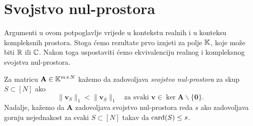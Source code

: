\documentclass[a4paper,twoside,12pt]{memoir} %
\newcommand{\vect}[1]{\mathbf{#1}}
\renewcommand{\vec}{\vect}
\newcommand{\card}{\text{\normalfont{card}}}
\newcommand{\norm}[1]{\|{#1}\|}
\begin{document}
\section[Svojstvo nul-prostora][Svojstvo nul-prostora]{Svojstvo nul-prostora}
Argumenti u ovom potpoglavlje vrijede u kontekstu realnih i u konteksu kompleksnih prostora. Stoga \'cemo rezultate prvo iznjeti za polje $\mathbb{K}$, koje mo\v{z}e biti $\mathbb{R}$ ili $\mathbb{C}$. Nakon toga uspostaviti \'cemo ekvivalenciju realnog i kompleksnog svojstva nul-prostora.

\begin{defn}
    Za matricu $\vec A \in \K^{m \times N}$ ka\v{z}emo da zadovoljava \textit{svojstvo nul-prostora} za skup $S \subset [N]$ ako
    \begin{equation}\label{svojstvo_nul_prostora}
        \norm{\vec v_S}_1 < \norm{\vec v_{\bar{S}}}_1  \quad \text{za svaki }\vec v \in \ker \vec A \backslash \{\vec 0\}.
    \end{equation}
    Nadalje, ka\v{z}emo da $\vec A$ zadovoljava svojstvo nul-prostora reda $s$ ako zadovoljava gornju nejednakost za svaki $S \subset [N]$ takav da $\card(S) \leq s$.
\end{defn}
\end{document}
